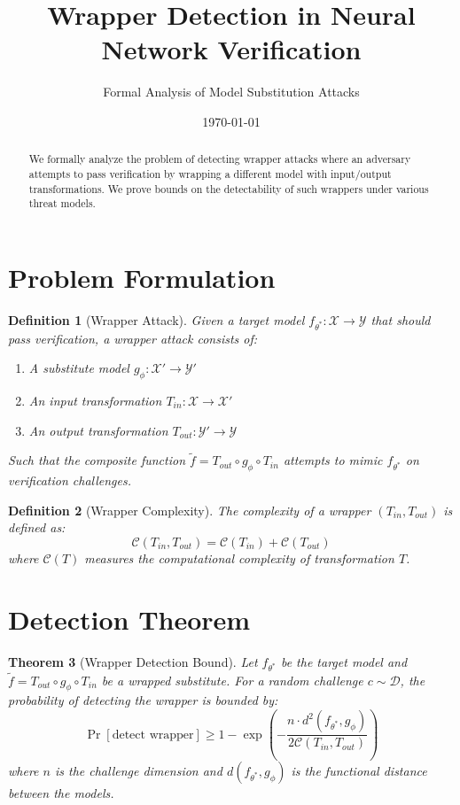 \documentclass[11pt]{article}
\title{Wrapper Detection in Neural Network Verification}
\author{Formal Analysis of Model Substitution Attacks}
\date{\today}
\theoremstyle{plain}
\newtheorem{theorem}{Theorem}
\newtheorem{definition}[theorem]{Definition}
\begin{document}
\maketitle

\begin{abstract}
We formally analyze the problem of detecting wrapper attacks where an 
adversary attempts to pass verification by wrapping a different model 
with input/output transformations. We prove bounds on the detectability 
of such wrappers under various threat models.
\end{abstract}

\section{Problem Formulation}

\begin{definition}[Wrapper Attack]
Given a target model $f_{\theta^*}: \mathcal{X} \rightarrow \mathcal{Y}$ that 
should pass verification, a wrapper attack consists of:
\begin{enumerate}
    \item A substitute model $g_{\phi}: \mathcal{X}' \rightarrow \mathcal{Y}'$
    \item An input transformation $T_{in}: \mathcal{X} \rightarrow \mathcal{X}'$
    \item An output transformation $T_{out}: \mathcal{Y}' \rightarrow \mathcal{Y}$
\end{enumerate}
Such that the composite function $\tilde{f} = T_{out} \circ g_{\phi} \circ T_{in}$ 
attempts to mimic $f_{\theta^*}$ on verification challenges.
\end{definition}

\begin{definition}[Wrapper Complexity]
The complexity of a wrapper $(T_{in}, T_{out})$ is defined as:
$$\mathcal{C}(T_{in}, T_{out}) = \mathcal{C}(T_{in}) + \mathcal{C}(T_{out})$$
where $\mathcal{C}(T)$ measures the computational complexity of transformation $T$.
\end{definition}

\section{Detection Theorem}

\begin{theorem}[Wrapper Detection Bound]
\label{thm:wrapper-detection}
Let $f_{\theta^*}$ be the target model and $\tilde{f} = T_{out} \circ g_{\phi} 
\circ T_{in}$ be a wrapped substitute. For a random challenge $c \sim \mathcal{D}$, 
the probability of detecting the wrapper is bounded by:
$$\Pr[\text{detect wrapper}] \geq 1 - \exp\left(-\frac{n \cdot d^2(f_{\theta^*}, g_{\phi})}{2\mathcal{C}(T_{in}, T_{out})}\right)$$
where $n$ is the challenge dimension and $d(f_{\theta^*}, g_{\phi})$ is the 
functional distance between the models.
\end{theorem}
\end{document}
